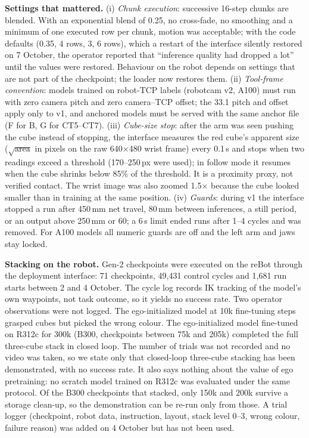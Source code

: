 \documentclass[conference,10pt]{IEEEtran}
\newcommand{\mm}{\,mm\xspace}
\begin{document}
\textbf{Settings that mattered.} (i) \emph{Chunk execution}: successive 16-step chunks are blended. With an exponential blend of
0.25, no cross-fade, no smoothing and a minimum of one executed row per chunk, motion was acceptable; with the code defaults (0.35, 4
rows, 3\textdegree, 6 rows), which a restart of the interface silently restored on 7 October, the operator reported that
``inference quality had dropped a lot'' until the values were restored. Behaviour on the robot depends on settings that are not part
of the checkpoint; the loader now restores them. (ii) \emph{Tool-frame convention}: models trained on robot-TCP labels (robotcam v2,
A100) must run with zero camera pitch and zero camera--TCP offset; the 33.1\textdegree{} pitch and offset apply only to v1, and
anchored models must be served with the same anchor file (F for B, G for CT5--CT7). (iii) \emph{Cube-size stop}: after the arm was
seen pushing the cube instead of stopping, the interface measures the red cube's apparent size ($\sqrt{\text{area}}$ in pixels on the
raw 640$\times$480 wrist frame) every 0.1\,s and stops when two readings exceed a threshold (170--250\,px were used); in follow mode it
resumes when the cube shrinks below 85\% of the threshold. It is a proximity proxy, not verified contact. The wrist image was also
zoomed 1.5$\times$ because the cube looked smaller than in training at the same position. (iv) \emph{Guards}: during v1 the interface
stopped a run after 450\mm net travel, 80\mm between inferences, a still period, or an output above 250\mm or 60\textdegree; a 6\,s
limit ended runs after 1--4 cycles and was removed. For A100 models all numeric guards are off and the left arm and jaws stay locked.

\textbf{Stacking on the robot.} Gen-2 checkpoints were executed on the reBot through the deployment interface: 71 checkpoints,
49{,}431 control cycles and 1{,}681 run starts between 2 and 4 October. The cycle log records IK tracking of the model's own
waypoints, not task outcome, so it yields no success rate. Two operator observations were not logged. The ego-initialized model at
10k fine-tuning steps grasped cubes but picked the wrong colour. The ego-initialized model fine-tuned on R312c for 300k (B300,
checkpoints between 75k and 205k) completed the full three-cube stack in closed loop. The number of trials was not recorded and no
video was taken, so we state only that closed-loop three-cube stacking has been demonstrated, with no success rate. It also says
nothing about the value of ego pretraining: no scratch model trained on R312c was evaluated under the same protocol. Of the B300
checkpoints that stacked, only 150k and 200k survive a storage clean-up, so the demonstration can be re-run only from those. A trial
logger (checkpoint, robot data, instruction, layout, stack level 0--3, wrong colour, failure reason) was added on 4 October but has
not been used.
\end{document}
